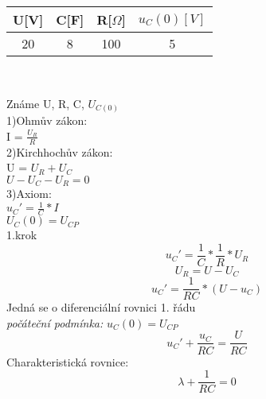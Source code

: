 \documentclass[12pt]{article}
\begin{document}
\begin{center}
\begin{tabular}{| c | c | c | c |}
\hline
U[V] & C[F] & R[$\Omega$] & $u_{C}(0)[V]$ \\
\hline
20 & 8 & 100 & 5\\
\hline
\end{tabular}\\
\end{center}
Známe U, R, C, $U_{C(0)}$\\
1)Ohmův zákon:\\ I = $\frac{U_{R}}{R}$\\
2)Kirchhochův zákon:\\ U = $U_{R}+U_{C}$\\ $U-U_{C}-U_{R}=0$\\
3)Axiom:\\$u_{C}'=\frac{1}{C}*I$\\ $U_{C}(0)=U_{CP}$\\
1.krok\\
\[
  u_{C}'=\displaystyle\frac{1}{C}*\displaystyle\frac{1}{R}*U_{R}
\]
\[
  U_{R} = U-U_{C}
\]
\[
  u_{C}'=\displaystyle\frac{1}{RC}*(U-u_{C})
\]
Jedná se o diferenciální rovnici 1. řádu\\
\textit{počáteční podmínka:} $u_{C}(0)=U_{CP}$\\
\[
  u_{C}'+\displaystyle\frac{u_{C}}{RC}= \displaystyle\frac{U}{RC}
\]
Charakteristická rovnice:
\[
  \lambda + \displaystyle\frac{1}{RC}=0
\]
\end{document}
